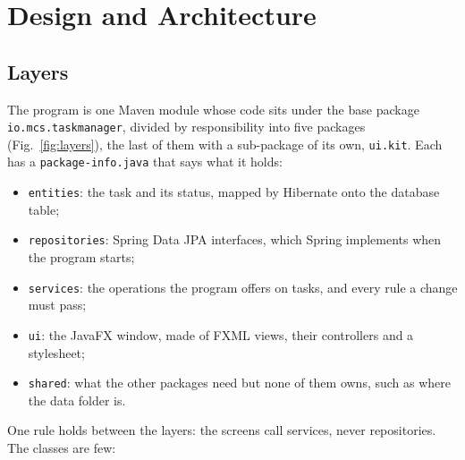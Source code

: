 \section{Design and Architecture}\label{sec:design}

\subsection{Layers}

The program is one Maven module whose code sits under the base package \texttt{io.mcs.taskmanager}, divided by
responsibility into five packages (Fig.~\ref{fig:layers}), the last of them with a sub-package of its own,
\texttt{ui.kit}. Each has a \texttt{package-info.java} that says what it
holds:
\begin{itemize}
  \item \texttt{entities}: the task and its status, mapped by Hibernate onto the database table;
  \item \texttt{repositories}: Spring Data JPA interfaces, which Spring implements when the program starts;
  \item \texttt{services}: the operations the program offers on tasks, and every rule a change must pass;
  \item \texttt{ui}: the JavaFX window, made of FXML views, their controllers and a stylesheet;
  \item \texttt{shared}: what the other packages need but none of them owns, such as where the data folder is.
\end{itemize}
One rule holds between the layers: the screens call services, never repositories. The classes are few:
